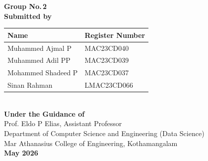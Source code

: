 \begin{titlepage}
{\normalsize \textbf{Group No.\,2}}\\[16pt]

{\normalsize \textbf{Submitted by}}\\[8pt]
\begin{tabular}{ll}
  \hline
  \rule{0pt}{10pt}
  \textbf{Name}                          & \textbf{Register Number} \\
  \hline\rule{0pt}{10pt}
  Muhammed Ajmal P                       & MAC23CD040               \\[4pt]
  Muhammed Adil PP                       & MAC23CD039               \\[4pt]
  Mohammed Shadeed P                     & MAC23CD037               \\[4pt]
  Sinan Rahman                           & LMAC23CD066              \\[4pt]
  \hline
\end{tabular}\\[18pt]

{\normalsize \textbf{Under the Guidance of}}\\[4pt]
{\normalsize Prof. Eldo P Elias, Assistant Professor}\\[4pt]
{\normalsize Department of Computer Science and Engineering (Data Science)}\\[4pt]
{\normalsize Mar Athanasius College of Engineering, Kothamangalam}\\[18pt]

{\normalsize \textbf{May 2026}}

\vfill
\end{titlepage}
